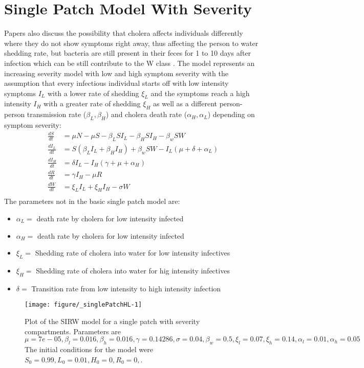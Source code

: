 \documentclass[12pt]{article}\usepackage[]{graphicx}\usepackage[]{color}
\makeatletter
\def\maxwidth{ %
  \ifdim\Gin@nat@width>\linewidth
    \linewidth
  \else
    \Gin@nat@width
  \fi
}
\newenvironment{knitrout}{}{} %
\makeatother
\begin{document}
\section{Single Patch Model With Severity}

Papers\cite{link15} \cite{link18} also discuss the possibility that cholera affects individuals differently where they do not show symptoms right away, thus affecting the person to water shedding rate, but bacteria are still present in their feces for 1 to 10 days after infection which can be still contribute to the W class \cite{link15}.
The model represents an increasing severity model with low and high symptom severity with the assumption that every infectious individual starts off with low intensity symptoms $I_L$ with a lower rate of shedding $\xi_L$ and the symptoms reach a high intensity $I_H$ with a greater rate of shedding $\xi_H$ as well as a different person-person transmission rate ($\beta_L, \beta_H$) and cholera death rate ($\alpha_H, \alpha_L$) depending on symptom severity:
\begin{align*}
    \frac{dS}{dt}&= \mu N - \mu S - \beta_L S I_L - \beta_H S I_H - \beta_w S W  \\
    \frac{dI_L}{dt}&= S(\beta_L I_L + \beta_H I_H) + \beta_w S W - I_L (\mu + \delta + \alpha_L) \\
    \frac{dI_H}{dt}&= \delta I_L - I_H (\gamma + \mu + \alpha_H) \\
    \frac{dR}{dt}&= \gamma I_H - \mu R \\
    \frac{dW}{dt}&= \xi_L I_L + \xi_H I_H  - \sigma W\\
\end{align*}
The parameters not in the basic single patch model are:
\begin{itemize}
	\item $\alpha_L=$ death rate by cholera for low intensity infected
	\item $\alpha_H=$ death rate by cholera for low intensity infected
    \item $\xi_L=$ Shedding rate of cholera into water for low intensity infectives
    \item $\xi_H=$ Shedding rate of cholera into water for hig intensity infectives
	\item $\delta=$ Transition rate from low intensity to high intensity infection
\end{itemize}

\begin{knitrout}
\color{fgcolor}\begin{figure}[h]
\texttt{[image: figure/\_singlePatchHL-1]} \caption{\label{fig:basesp} Plot of the SIRW model for a single patch with severity compartments. Parameters are $\mu=7e-05,\beta_l=0.016,\beta_h=0.016,\gamma=0.14286,\sigma=0.04,\beta_w=0.5,\xi_l=0.07,\xi_h=0.14,\alpha_l=0.01,\alpha_h=0.05$ The initial conditions for the model were $S_0=0.99,L_0=0.01,H_0=0,R_0=0,$.}\label{fig:<singlePatchHL}
\end{figure}


\end{knitrout}
\FloatBarrier
\end{document}

